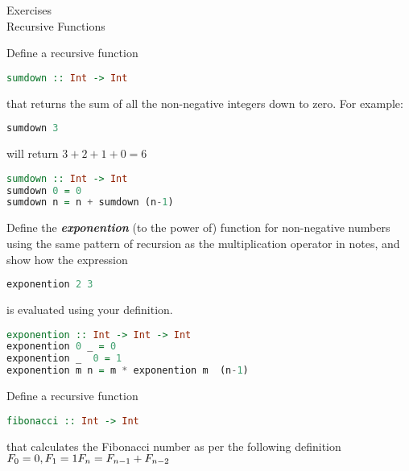 \documentclass{article}
\newcommand\ExTitle{Recursive Functions}
\newcommand\fullExTitle{Exercises\\ \ExTitle }
\begin{document}
\begin{Huge}
	\begin{center}
	\fullExTitle
	\end{center}
\end{Huge}
\begin{Exercise}[difficulty = 2] 
Define a recursive function \\
\begin{lstlisting}[language=Haskell]
  sumdown :: Int -> Int
\end{lstlisting}
that returns the sum of all the non-negative integers down to zero. For example:
\begin{lstlisting}[language=Haskell]
sumdown 3
\end{lstlisting}
will return $ 3 +2+1+0 = 6$
\end{Exercise}
\begin{Answer}
\begin{lstlisting}[language=Haskell]
sumdown :: Int -> Int 
sumdown 0 = 0
sumdown n = n + sumdown (n-1) 
\end{lstlisting}
\end{Answer}
\begin{Exercise}[difficulty = 2]
Define the \textbf{\textit{exponention}} (to the power of) function for non-negative numbers using the same pattern of recursion as the multiplication operator in notes, and show how the expression 
\begin{lstlisting}[language=Haskell]
  exponention 2 3
\end{lstlisting}
is evaluated using your definition.
\end{Exercise}
\begin{Answer}
\begin{lstlisting}[language=Haskell]
exponention :: Int -> Int -> Int
exponention 0 _ = 0
exponention _  0 = 1
exponention m n = m * exponention m  (n-1)
\end{lstlisting}
\end{Answer}
\begin{Exercise}[difficulty = 2]
Define a recursive function \\
\begin{lstlisting}[language=Haskell]
fibonacci :: Int -> Int
\end{lstlisting}
that calculates the Fibonacci number as per the following definition \\
$
F_{0} = 0, F_{1} = 1 \\
F_{n} = F_{n-1} + F_{n-2}
$

\end{Exercise}
\end{document}
